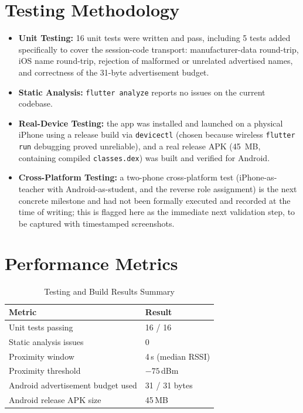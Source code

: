 \documentclass[12pt,a4paper]{report}
\begin{document}
\section{Testing Methodology}
\begin{itemize}
  \item \textbf{Unit Testing:} 16 unit tests were written and pass, including 5 tests added specifically to cover the session-code transport: manufacturer-data round-trip, iOS name round-trip, rejection of malformed or unrelated advertised names, and correctness of the 31-byte advertisement budget.
  \item \textbf{Static Analysis:} \texttt{flutter analyze} reports no issues on the current codebase.
  \item \textbf{Real-Device Testing:} the app was installed and launched on a physical iPhone using a release build via \texttt{devicectl} (chosen because wireless \texttt{flutter run} debugging proved unreliable), and a real release APK (45~MB, containing compiled \texttt{classes.dex}) was built and verified for Android.
  \item \textbf{Cross-Platform Testing:} a two-phone cross-platform test (iPhone-as-teacher with Android-as-student, and the reverse role assignment) is the next concrete milestone and had not been formally executed and recorded at the time of writing; this is flagged here as the immediate next validation step, to be captured with timestamped screenshots.
\end{itemize}

\section{Performance Metrics}
\begin{table}[H]
  \centering
  \begin{tabular}{@{}ll@{}}
    \toprule
    \textbf{Metric} & \textbf{Result} \\
    \midrule
    Unit tests passing & 16 / 16 \\
    Static analysis issues & 0 \\
    Proximity window & 4\,s (median RSSI) \\
    Proximity threshold & $-75$\,dBm \\
    Android advertisement budget used & 31 / 31 bytes \\
    Android release APK size & 45\,MB \\
    \bottomrule
  \end{tabular}
  \caption{Testing and Build Results Summary}
\end{table}
\end{document}
